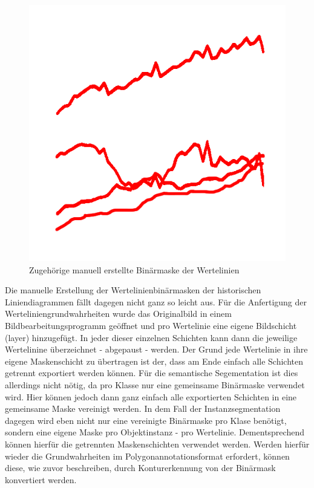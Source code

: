 \begin{figure}[H]
\begin{minipage}{0.475\textwidth}
        \includegraphics[width=\linewidth]{Methodik/img/lines_historical_mask.png}
        \caption{ Zugehörige manuell erstellte Binärmaske der Wertelinien}
        \label{fig:lines_historical_mask}
    \end{minipage}
\end{figure}

Die manuelle Erstellung der Wertelinienbinärmasken der historischen Liniendiagrammen fällt dagegen nicht ganz so leicht aus. Für die Anfertigung der Werteliniengrundwahrheiten wurde das Originalbild in einem Bildbearbeitungsprogramm \cite{photopea} geöffnet und pro Wertelinie eine eigene Bildschicht (layer) hinzugefügt. In jeder dieser einzelnen Schichten kann dann die jeweilige Wertelinine überzeichnet - abgepaust - werden. Der Grund jede Wertelinie in ihre eigene Maskenschicht zu übertragen ist der, dass am Ende einfach alle Schichten getrennt exportiert werden können. Für die semantische Segementation ist dies allerdings nicht nötig, da pro Klasse nur eine gemeinsame Binärmaske verwendet wird. Hier können jedoch dann ganz einfach alle exportierten Schichten in eine gemeinsame Maske vereinigt werden. In dem Fall der Instanzsegmentation dagegen wird eben nicht nur eine vereinigte Binärmaske pro Klase benötigt, sondern eine eigene Maske pro Objektinstanz - pro Wertelinie. Dementsprechend können hierfür die getrennten Maskenschichten verwendet werden. Werden hierfür wieder die Grundwahrheiten im Polygonannotationsformat erfordert, können diese, wie zuvor beschreiben, durch Konturerkennung von der Binärmask konvertiert werden.